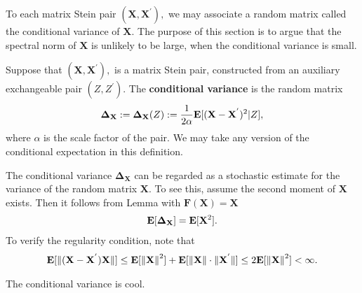 To each matrix Stein pair 
  $
  (
    \mathbf{X}
    ,
    \mathbf{X}^{'}
  ),
  $
  we may associate a random matrix called the conditional variance of $\mathbf{X}.$
  The purpose of this section is to argue that the spectral norm of $\mathbf{X}$
  is unlikely to be large, when the conditional variance is small.
\begin{definition}
  Suppose that
  $
  (
    \mathbf{X}
    ,
    \mathbf{X}^{'}
  ),
  $
  is a matrix Stein pair, constructed from an auxiliary exchangeable pair
  $
  (
  Z
    ,
  Z^{'}
  ).
  $
  The \textbf{conditional variance}
  is the random matrix
  \begin{gather}
    \mathbf{\Delta_X}
    :=
    \mathbf{\Delta_X}
    (Z)
    :=
    \frac{1}{2\alpha}
    \mathbf{E}
    [
    (
    \mathbf{X}
    -
    \mathbf{X}^{'}
    )^2
    \vert
    Z
    ]
    ,
  \end{gather}
  where $\alpha$ is the scale factor of the pair. We may take any version of the conditional expectation in this definition.
\end{definition}

The conditional variance
$
    \mathbf{\Delta_X}
$
can be regarded as a stochastic estimate for the variance 
of the random matrix $\mathbf{X}.$
To see this, assume
the second moment of $\mathbf{X}$ exists. Then it follows from Lemma 
with $\mathbf{F}(\mathbf{X})=\mathbf{X}$
\begin{gather}
  \mathbf{E}
  [
    \mathbf{\Delta_X}
  ]
  =
  \mathbf{E}
  [
  \mathbf{X}^2
  ]
  .
\end{gather}
To verify the regularity condition, note that
\begin{gather}
  \mathbf{E}
  [
  \lVert
    (
    \mathbf{X}
    -
    \mathbf{X}^{'}
    )
    \mathbf{X}
    \rVert
  ]
  \le
  \mathbf{E}[
  \left\lVert
    \mathbf{X}
  \right\rVert
  ^2
  ]
  +
  \mathbf{E}
  [
  \left\lVert
    \mathbf{X}
  \right\rVert
  \cdot
  \lVert
    \mathbf{X}^{'}
    \rVert
  ]
  \le
  2
  \mathbf{E}
  [
  \left\lVert
    \mathbf{X}
  \right\rVert
  ^2
  ]
  <
  \infty
  .
\end{gather}
\begin{example}
  \emph{\cite[Example~2.4]{Mackey2014}}
\end{example}
\begin{takeaways}
  The conditional variance is cool.
  \lipsum[1]
\end{takeaways}
